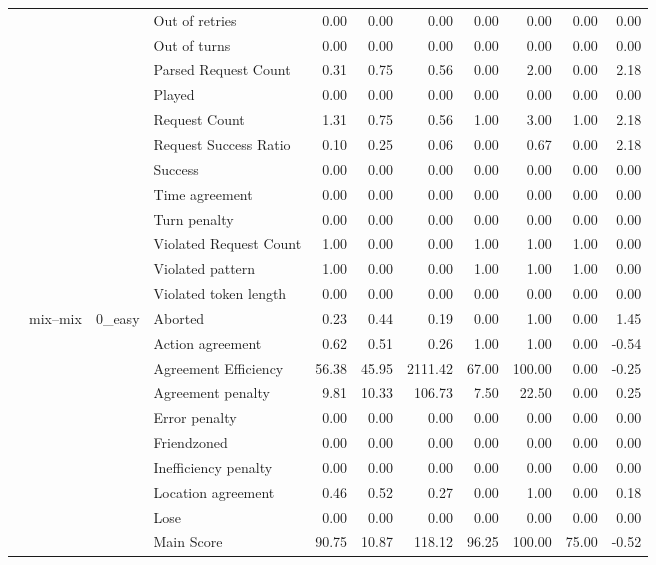 \begin{tabular}{llllrrrrrrr}
 &  &  & Out of retries & 0.00 & 0.00 & 0.00 & 0.00 & 0.00 & 0.00 & 0.00 \\
 &  &  & Out of turns & 0.00 & 0.00 & 0.00 & 0.00 & 0.00 & 0.00 & 0.00 \\
 &  &  & Parsed Request Count & 0.31 & 0.75 & 0.56 & 0.00 & 2.00 & 0.00 & 2.18 \\
 &  &  & Played & 0.00 & 0.00 & 0.00 & 0.00 & 0.00 & 0.00 & 0.00 \\
 &  &  & Request Count & 1.31 & 0.75 & 0.56 & 1.00 & 3.00 & 1.00 & 2.18 \\
 &  &  & Request Success Ratio & 0.10 & 0.25 & 0.06 & 0.00 & 0.67 & 0.00 & 2.18 \\
 &  &  & Success & 0.00 & 0.00 & 0.00 & 0.00 & 0.00 & 0.00 & 0.00 \\
 &  &  & Time agreement & 0.00 & 0.00 & 0.00 & 0.00 & 0.00 & 0.00 & 0.00 \\
 &  &  & Turn penalty & 0.00 & 0.00 & 0.00 & 0.00 & 0.00 & 0.00 & 0.00 \\
 &  &  & Violated Request Count & 1.00 & 0.00 & 0.00 & 1.00 & 1.00 & 1.00 & 0.00 \\
 &  &  & Violated pattern & 1.00 & 0.00 & 0.00 & 1.00 & 1.00 & 1.00 & 0.00 \\
 &  &  & Violated token length & 0.00 & 0.00 & 0.00 & 0.00 & 0.00 & 0.00 & 0.00 \\
\cline{2-11} \cline{3-11}
 & \multirow[t]{378}{*}{mix--mix} & \multirow[t]{27}{*}{0_easy} & Aborted & 0.23 & 0.44 & 0.19 & 0.00 & 1.00 & 0.00 & 1.45 \\
 &  &  & Action agreement & 0.62 & 0.51 & 0.26 & 1.00 & 1.00 & 0.00 & -0.54 \\
 &  &  & Agreement Efficiency & 56.38 & 45.95 & 2111.42 & 67.00 & 100.00 & 0.00 & -0.25 \\
 &  &  & Agreement penalty & 9.81 & 10.33 & 106.73 & 7.50 & 22.50 & 0.00 & 0.25 \\
 &  &  & Error penalty & 0.00 & 0.00 & 0.00 & 0.00 & 0.00 & 0.00 & 0.00 \\
 &  &  & Friendzoned & 0.00 & 0.00 & 0.00 & 0.00 & 0.00 & 0.00 & 0.00 \\
 &  &  & Inefficiency penalty & 0.00 & 0.00 & 0.00 & 0.00 & 0.00 & 0.00 & 0.00 \\
 &  &  & Location agreement & 0.46 & 0.52 & 0.27 & 0.00 & 1.00 & 0.00 & 0.18 \\
 &  &  & Lose & 0.00 & 0.00 & 0.00 & 0.00 & 0.00 & 0.00 & 0.00 \\
 &  &  & Main Score & 90.75 & 10.87 & 118.12 & 96.25 & 100.00 & 75.00 & -0.52 \\

\end{tabular}
